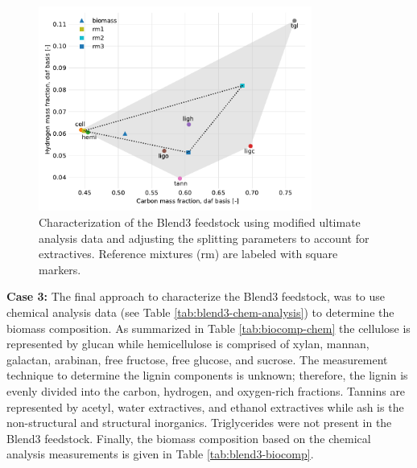 \begin{figure}[H]
    \centering
    \includegraphics[width=0.8\textwidth]{figures/blend3-biocharact-ultmod.pdf}
    \caption{Characterization of the Blend3 feedstock using modified ultimate analysis data and adjusting the splitting parameters to account for extractives. Reference mixtures (rm) are labeled with square markers.}
    \label{fig:blend3-biocharact-ultmod}
\end{figure}

\textbf{Case 3:} The final approach to characterize the Blend3 feedstock, was to use chemical analysis data (see Table \ref{tab:blend3-chem-analysis}) to determine the biomass composition. As summarized in Table \ref{tab:biocomp-chem} the cellulose is represented by glucan while hemicellulose is comprised of xylan, mannan, galactan, arabinan, free fructose, free glucose, and sucrose. The measurement technique to determine the lignin components is unknown; therefore, the lignin is evenly divided into the carbon, hydrogen, and oxygen-rich fractions. Tannins are represented by acetyl, water extractives, and ethanol extractives while ash is the non-structural and structural inorganics. Triglycerides were not present in the Blend3 feedstock. Finally, the biomass composition based on the chemical analysis measurements is given in Table \ref{tab:blend3-biocomp}.

